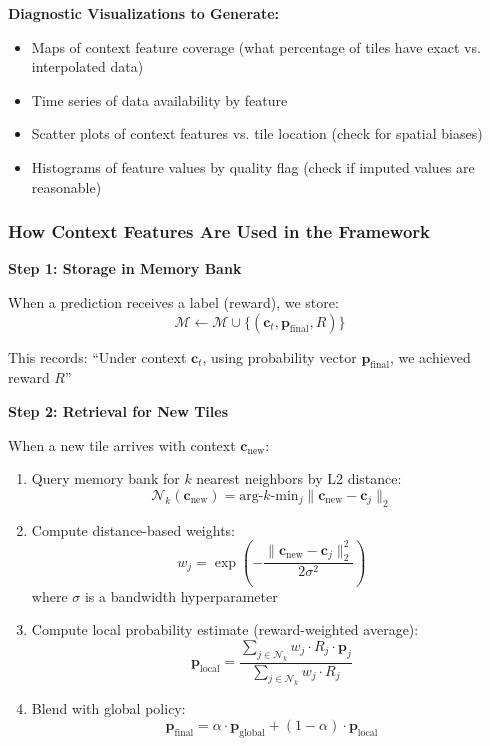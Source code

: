 \documentclass[11pt]{article}
\begin{document}
\textbf{Diagnostic Visualizations to Generate:}

\begin{itemize}
    \item Maps of context feature coverage (what percentage of tiles have exact vs. interpolated data)
    \item Time series of data availability by feature
    \item Scatter plots of context features vs. tile location (check for spatial biases)
    \item Histograms of feature values by quality flag (check if imputed values are reasonable)
\end{itemize}

\subsubsection{How Context Features Are Used in the Framework}

\textbf{Step 1: Storage in Memory Bank}

When a prediction receives a label (reward), we store:
\[
\mathcal{M} \leftarrow \mathcal{M} \cup \{(\mathbf{c}_t, \mathbf{p}_{\text{final}}, R)\}
\]

This records: ``Under context $\mathbf{c}_t$, using probability vector $\mathbf{p}_{\text{final}}$, we achieved reward $R$''

\textbf{Step 2: Retrieval for New Tiles}

When a new tile arrives with context $\mathbf{c}_{\text{new}}$:

\begin{enumerate}
    \item Query memory bank for $k$ nearest neighbors by L2 distance:
    \[
    \mathcal{N}_k(\mathbf{c}_{\text{new}}) = \text{arg-}k\text{-min}_{j} \|\mathbf{c}_{\text{new}} - \mathbf{c}_j\|_2
    \]

    \item Compute distance-based weights:
    \[
    w_j = \exp\left(-\frac{\|\mathbf{c}_{\text{new}} - \mathbf{c}_j\|_2^2}{2\sigma^2}\right)
    \]
    where $\sigma$ is a bandwidth hyperparameter

    \item Compute local probability estimate (reward-weighted average):
    \[
    \mathbf{p}_{\text{local}} = \frac{\sum_{j \in \mathcal{N}_k} w_j \cdot R_j \cdot \mathbf{p}_j}{\sum_{j \in \mathcal{N}_k} w_j \cdot R_j}
    \]

    \item Blend with global policy:
    \[
    \mathbf{p}_{\text{final}} = \alpha \cdot \mathbf{p}_{\text{global}} + (1-\alpha) \cdot \mathbf{p}_{\text{local}}
    \]
\end{enumerate}
\end{document}
